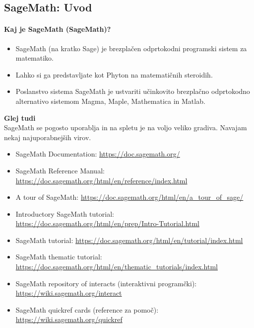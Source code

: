 \subsection{SageMath: Uvod}

\paragraph{Kaj je SageMath (SageMath)?}

\begin{itemize}
\item SageMath (na kratko Sage) je brezplačen odprtokodni programski sistem za matematiko.
\item Lahko si ga predstavljate kot Phyton na matematičnih steroidih.
\item Poslanstvo sistema SageMath je ustvariti učinkovito brezplačno odprtokodno alternativo sistemom Magma, Maple, Mathematica in Matlab.
\end{itemize}

\begin{framed}
\textbf{Glej tudi}\\
SageMath se pogosto uporablja in na spletu je na voljo veliko gradiva. Navajam nekaj najuporabnejših virov.

\begin{itemize}
\item SageMath Documentation: \href{https://doc.sagemath.org/}{https://doc.sagemath.org/}
\item SageMath Reference Manual: \href{https://doc.sagemath.org/html/en/reference/index.html}{https://doc.sagemath.org/html/en/reference/index.html}
\item A tour of SageMath: \href{https://doc.sagemath.org/html/en/a\_tour\_of\_sage/}{https://doc.sagemath.org/html/en/a\_tour\_of\_sage/}
\item Introductory SageMath tutorial: \href{https://doc.sagemath.org/html/en/prep/Intro-Tutorial.html}{https://doc.sagemath.org/html/en/prep/Intro-Tutorial.html}
\item SageMath tutorial: \href{https://doc.sagemath.org/html/en/tutorial/index.html}{https://doc.sagemath.org/html/en/tutorial/index.html}
\item SageMath thematic tutorial: \href{https://doc.sagemath.org/html/en/thematic\_tutorials/index.html}{https://doc.sagemath.org/html/en/thematic\_tutorials/index.html}
\item SageMath repository of interacts (interaktivni programčki): \href{https://wiki.sagemath.org/interact}{https://wiki.sagemath.org/interact}
\item SageMath quickref cards (reference za pomoč): \href{https://wiki.sagemath.org/quickref}{https://wiki.sagemath.org/quickref}
\end{itemize}
\end{framed}

